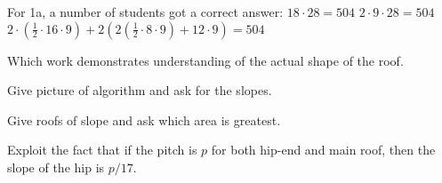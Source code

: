 \documentclass{ximera}
\begin{document}
\begin{exercise}
  For 1a, a number of students got a correct answer:
  $18\cdot 28 = 504$
  $2\cdot9\cdot 28 = 504$
  $2\cdot(\frac{1}{2}\cdot 16\cdot 9) + 2(2(\frac{1}{2}\cdot 8\cdot 9)+12\cdot 9)=504$

  Which work demonstrates understanding of the actual shape of the roof.
  
\end{exercise}




\begin{exercise}
  Give picture of algorithm and ask for the slopes.
\end{exercise}

\begin{exercise}
  Give roofs of slope and ask which area is greatest. 
\end{exercise}


\begin{exercise}
  Exploit the fact that if the pitch is $p$ for both hip-end and main roof, then the slope of the hip is $p/17$.
\end{exercise}
\end{document}
